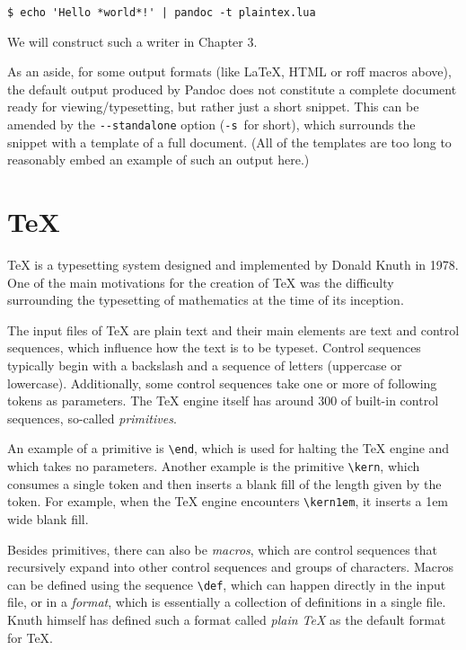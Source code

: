 \documentclass[
  digital,     %
  oneside,     %
  nosansbold,  %
  nocolorbold, %
  lof,         %
  nolot,       %
]{fithesis4}
\newcommand\macro[1]{\texttt{\textbackslash{}{#1}}}
\begin{document}
\noindent
\begin{lstlisting}
$ echo 'Hello *world*!' | pandoc -t plaintex.lua
\end{lstlisting}

\noindent
We will construct such a writer in Chapter 3.

As an aside, for some output formats (like \LaTeX{}, HTML or roff macros above), the default output produced by Pandoc does not constitute a complete document ready for viewing/typesetting, but rather just a short snippet. This can be amended by the \texttt{-{}-standalone} option (\texttt{-s}~for short), which surrounds the snippet with a template of a full document. (All of the templates are too long to reasonably embed an example of such an output here.)

\section{\TeX{}}
\TeX{} is a typesetting system designed and implemented by Donald Knuth in 1978. One of the main motivations for the creation of \TeX{} was the difficulty surrounding the typesetting of mathematics at the time of its inception.

The input files of \TeX{} are plain text and their main elements are text and control sequences, which influence how the text is to be typeset. Control sequences typically begin with a backslash and a sequence of letters (uppercase or lowercase). Additionally, some control sequences take one or more of following tokens as parameters. The \TeX{} engine itself has around 300 of built-in control sequences, so-called \textit{primitives}.

An example of a primitive is \macro{end}, which is used for halting the \TeX{} engine and which takes no parameters. Another example is the primitive \macro{kern}, which consumes a single token and then inserts a blank fill of the length given by the token. For example, when the \TeX{} engine encounters \macro{kern1em}, it inserts a 1em wide blank fill.

Besides primitives, there can also be \textit{macros}, which are control sequences that recursively expand into other control sequences and groups of characters. Macros can be defined using the sequence \macro{def}, which can happen directly in the input file, or in a \textit{format}, which is essentially a collection of definitions in a single file. Knuth himself has defined such a format called \textit{plain \TeX{}} as the default format for \TeX{}.
\end{document}
